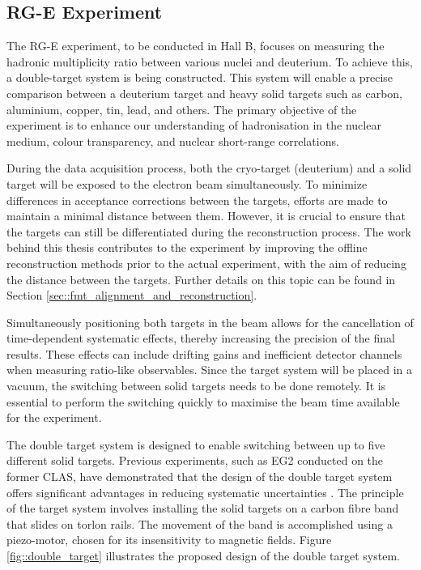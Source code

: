 \subsection{RG-E Experiment}
\label{ssec::rge_experiment}
    The RG-E experiment, to be conducted in Hall B, focuses on measuring the hadronic multiplicity ratio between various nuclei and deuterium.
    To achieve this, a double-target system is being constructed.
    This system will enable a precise comparison between a deuterium target and heavy solid targets such as carbon, aluminium, copper, tin, lead, and others.
    The primary objective of the experiment is to enhance our understanding of hadronisation in the nuclear medium, colour transparency, and nuclear short-range correlations.

    During the data acquisition process, both the cryo-target (deuterium) and a solid target will be exposed to the electron beam simultaneously.
    To minimize differences in acceptance corrections between the targets, efforts are made to maintain a minimal distance between them.
    However, it is crucial to ensure that the targets can still be differentiated during the reconstruction process.
    The work behind this thesis contributes to the experiment by improving the offline reconstruction methods prior to the actual experiment, with the aim of reducing the distance between the targets.
    Further details on this topic can be found in Section \ref{sec::fmt_alignment_and_reconstruction}.

    Simultaneously positioning both targets in the beam allows for the cancellation of time-dependent systematic effects, thereby increasing the precision of the final results.
    These effects can include drifting gains and inefficient detector channels when measuring ratio-like observables.
    Since the target system will be placed in a vacuum, the switching between solid targets needs to be done remotely.
    It is essential to perform the switching quickly to maximise the beam time available for the experiment.

    The double target system is designed to enable switching between up to five different solid targets.
    Previous experiments, such as EG2 conducted on the former CLAS, have demonstrated that the design of the double target system offers significant advantages in reducing systematic uncertainties \cite{hakobyan2008}.
    The principle of the target system involves installing the solid targets on a carbon fibre band that slides on torlon rails.
    The movement of the band is accomplished using a piezo-motor, chosen for its insensitivity to magnetic fields.
    Figure \ref{fig::double_target} illustrates the proposed design of the double target system.

